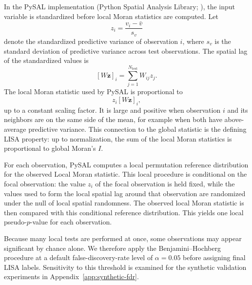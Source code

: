 In the PySAL implementation (Python Spatial Analysis Library; \citealp{pysal2007}),
the input variable is standardized before local Moran statistics are computed. Let
\[
z_i = \frac{v_i-\bar{v}}{s_v}
\]
denote the standardized predictive variance of observation $i$, where $s_v$ is the standard
deviation of predictive variance across test observations. The spatial lag of the
standardized values is
\[
[W\mathbf{z}]_i = \sum_{j=1}^{N_{\mathrm{test}}} W_{ij}z_j.
\]
The local Moran statistic used by PySAL is proportional to
\[
z_i[W\mathbf{z}]_i,
\]
up to a constant scaling factor. It is large and positive when observation $i$ and its
neighbors are on the same side of the mean, for example when both have above-average
predictive variance. This connection to the global statistic is the defining LISA property:
up to normalization, the sum of the local Moran statistics is proportional to global
Moran's $I$.

For each observation, PySAL computes a local permutation reference distribution for the
observed Local Moran statistic. This local procedure is conditional on the focal
observation: the value $z_i$ of the focal observation is held fixed, while the values used
to form the local spatial lag around that observation are randomized under the null of
local spatial randomness. The observed local Moran statistic is then compared with this
conditional reference distribution. This yields one local pseudo-$p$-value for each
observation.

Because many local tests are performed at once, some observations may appear significant
by chance alone. We therefore apply the Benjamini--Hochberg procedure
\citep{benjamini_hochberg_1995} at a default false-discovery-rate level of
$\alpha = 0.05$ before assigning final LISA labels. Sensitivity to this threshold is
examined for the synthetic validation experiments in Appendix~\ref{app:synthetic-fdr}.


